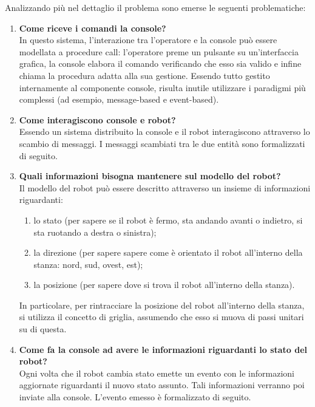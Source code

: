 Analizzando più nel dettaglio il problema sono emerse le seguenti problematiche: 
\begin{enumerate}
    \item \textbf{Come riceve i comandi la console?}\\
    In questo sistema, l'interazione tra l'operatore e la console può essere modellata a procedure call: l'operatore preme un pulsante su un'interfaccia grafica, la console elabora il comando verificando che esso sia valido e infine chiama la procedura adatta alla sua gestione. 
    Essendo tutto gestito internamente al componente console, risulta inutile utilizzare i paradigmi più complessi (ad esempio, message-based e event-based).
        
    \item \textbf{Come interagiscono console e robot?}\\
    Essendo un sistema distribuito la console e il robot interagiscono attraverso lo scambio di messaggi. I messaggi scambiati tra le due entità sono formalizzati di seguito.
    
   
   
   \item \textbf{Quali informazioni bisogna mantenere sul modello del robot?}\\
   Il modello del robot può essere descritto attraverso un insieme di informazioni riguardanti:
   \begin{enumerate}
       \item lo stato (per sapere se il robot è fermo, sta andando avanti o indietro, si sta ruotando a destra o sinistra);
       \item la direzione (per sapere sapere come è orientato il robot all'interno della stanza: nord, sud, ovest, est);
       \item la posizione (per sapere dove si trova il robot all'interno della stanza).
   \end{enumerate} 
   
  In particolare, per rintracciare la posizione del robot all'interno della stanza, si utilizza il concetto di griglia, assumendo che esso si muova di passi unitari su di questa.
    
    \item \textbf{Come fa la console ad avere le informazioni riguardanti lo stato del robot?}\\
    Ogni volta che il robot cambia stato emette un evento con le informazioni aggiornate riguardanti il nuovo stato assunto. Tali informazioni verranno poi inviate alla console. L'evento emesso è formalizzato di seguito. 
    

\end{enumerate}
